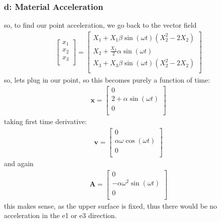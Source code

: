 \subsubsection*{d: Material Acceleration}
so, to find our point acceleration, we go back to the vector field
\begin{gather}
\begin{bmatrix}
    x_1 \\
    x_2 \\
    x_3 \\
\end{bmatrix}=
\begin{bmatrix}
    X_1+X_1\beta\sin(\omega t)(X_2^2-2X_2)\\
    X_2+\frac{X_2}{2}\alpha\sin(\omega t)\\
    X_3+X_3\beta\sin(\omega t)(X_2^2-2X_2)\\
\end{bmatrix}
\end{gather}
so, lets plug in our point, so this becomes purely a function of time:
\begin{gather}
\bm{x}=
\begin{bmatrix}
    0\\
    2+\alpha\sin(\omega t)\\
    0\\
\end{bmatrix}
\end{gather}
taking first time derivative:
\begin{gather}
\bm{v}=
\begin{bmatrix}
    0\\
    \alpha\omega\cos(\omega t)\\
    0\\
\end{bmatrix}
\end{gather}
and again
\begin{gather}
\boxed{\bm{A}=
\begin{bmatrix}
    0\\
    -\alpha\omega^2\sin(\omega t)\\
    0\\
\end{bmatrix}}
\end{gather}
this makes sense, as the upper surface is fixed, thus there would be no acceleration in the e1 or e3 direction.

